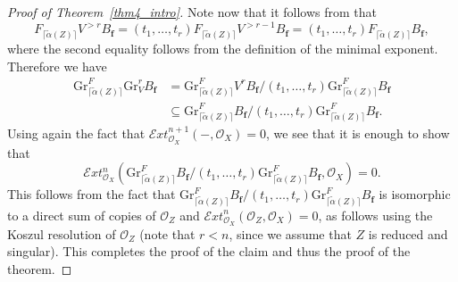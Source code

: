 \documentclass[11pt]{article}
\numberwithin{equation}{section}
\theoremstyle{plain}
\theoremstyle{definition}
\newcommand\cE{\mathcal{E}}
\newcommand\cO{\mathcal{O}}
\newcommand\cO{\mathcal{O}}
\newcommand\bff{{\boldsymbol f}}
\newcommand\gr{\mathrm{Gr}}
\begin{document}
\begin{proof}[Proof of Theorem~\ref{thm4_intro}]
Note now that it follows from \cite[Th.\,1.1]{CD} that\vspace*{-3pt}
\[F_{\lceil \widetilde{\alpha}(Z) \rceil} V^{>r}B_\bff = (t_1,\ldots,t_r)F_{\lceil \widetilde{\alpha}(Z)\rceil}V^{>r-1}B_{\bff}=
(t_1,\dots, t_r)F_{\lceil \widetilde{\alpha}(Z) \rceil} B_\bff,\]
where the second equality follows from the definition of the minimal exponent.
Therefore we have\vspace*{-3pt}
\[\begin{aligned} \gr^F_{\lceil \widetilde{\alpha}(Z) \rceil} \gr^r_V B_\bff&=\gr^F_{\lceil \widetilde{\alpha}(Z) \rceil}V^rB_{\bff}/(t_1,\ldots,t_r)\gr^F_{\lceil \widetilde{\alpha}(Z) \rceil}B_{\bff} \\
&\subseteq \gr^F_{\lceil \widetilde{\alpha}(Z) \rceil}B_\bff/(t_1,\dots, t_r) \gr^F_{\lceil \widetilde{\alpha}(Z) \rceil}B_\bff. \end{aligned}\]
Using again the fact that ${\mathcal Ext}^{n+1}_{\cO_X}(-,\cO_X)=0$, we see that it is enough to show that\vspace*{-3pt}
\[ \cE xt^n_{\cO_X}(\gr^F_{\lceil \widetilde{\alpha}(Z) \rceil}B_\bff/(t_1,\dots, t_r) \gr^F_{\lceil \widetilde{\alpha}(Z) \rceil}B_\bff,\cO_X) =0.\]
This follows from the fact that $\gr^F_{\lceil \widetilde{\alpha}(Z) \rceil}B_\bff/(t_1,\dots, t_r) \gr^F_{\lceil \widetilde{\alpha}(Z) \rceil}B_\bff$
is isomorphic to a direct sum of copies of $\cO_Z$ and ${\mathcal Ext}^n_{\cO_X}(\cO_Z,\cO_X)=0$, as follows using the
Koszul resolution of $\cO_Z$ (note that $r<n$, since we assume that $Z$ is reduced and singular). This completes the proof of the claim and thus
the proof of the theorem.
\end{proof}


\end{document}
